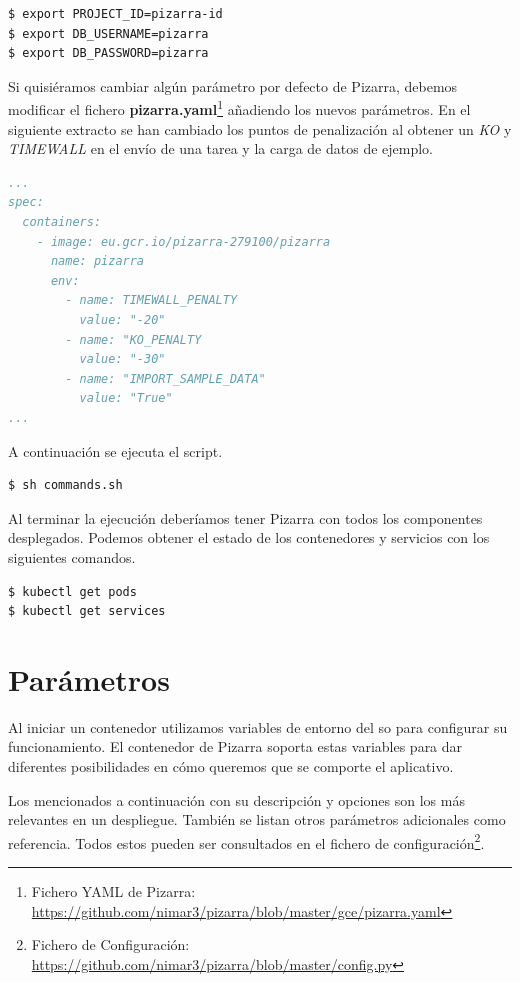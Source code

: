 \documentclass[11pt,spanish,listoffigures,listoftables]{tfgetsinf}
\begin{document}
\begin{lstlisting}[language=bash]
$ export PROJECT_ID=pizarra-id
$ export DB_USERNAME=pizarra
$ export DB_PASSWORD=pizarra
\end{lstlisting}

Si quisiéramos cambiar algún parámetro por defecto de Pizarra, debemos modificar el fichero \textbf{pizarra.yaml}\footnote{Fichero YAML de Pizarra: \url{https://github.com/nimar3/pizarra/blob/master/gce/pizarra.yaml}} añadiendo los nuevos parámetros. En el siguiente extracto se han cambiado los puntos de penalización al obtener un \textit{KO} y \textit{TIMEWALL} en el envío de una \Gls{tarea} y la carga de datos de ejemplo.

\begin{lstlisting}[language=yaml]
...
spec:
  containers:
    - image: eu.gcr.io/pizarra-279100/pizarra
      name: pizarra
      env:
        - name: TIMEWALL_PENALTY
          value: "-20"
        - name: "KO_PENALTY
          value: "-30"
        - name: "IMPORT_SAMPLE_DATA"
          value: "True"
...          
\end{lstlisting}

A continuación se ejecuta el script.

\begin{lstlisting}[language=bash]
$ sh commands.sh
\end{lstlisting}

Al terminar la ejecución deberíamos tener Pizarra con todos los componentes desplegados. Podemos obtener el estado de los contenedores y servicios con los siguientes comandos.

\begin{lstlisting}[language=bash]
$ kubectl get pods
$ kubectl get services
\end{lstlisting}

\section{Parámetros}

Al iniciar un \Gls{contenedor} utilizamos variables de entorno del \acrshort{so} para configurar su funcionamiento. El \Gls{contenedor} de Pizarra soporta estas variables para dar diferentes posibilidades en cómo queremos que se comporte el aplicativo. 

Los mencionados a continuación con su descripción y opciones son los más relevantes en un despliegue. También se listan otros parámetros adicionales como referencia. Todos estos pueden ser consultados en el fichero de configuración\footnote{Fichero de Configuración: \url{https://github.com/nimar3/pizarra/blob/master/config.py}}.
\end{document}
